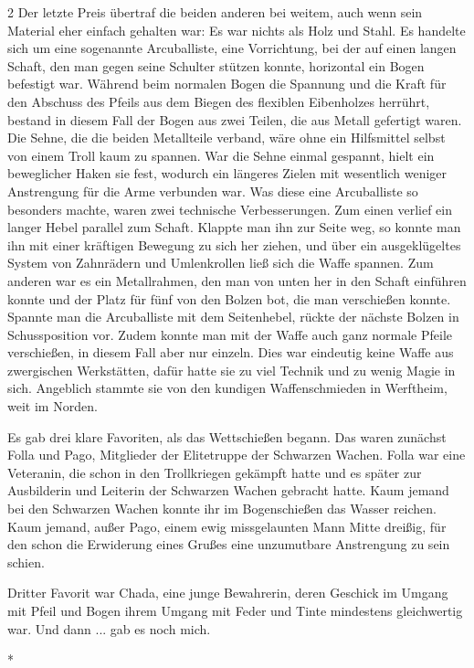 \documentclass[10pt, a4paper, oneside]{book}
\begin{document}
\begin{multicols}{2}
Der letzte Preis übertraf die beiden anderen bei weitem, auch wenn sein Material eher einfach gehalten war: Es war nichts als Holz und Stahl. Es handelte sich um eine sogenannte Arcuballiste, eine Vorrichtung, bei der auf einen langen Schaft, den man gegen seine Schulter stützen konnte, horizontal ein Bogen befestigt war. Während beim normalen Bogen die Spannung und die Kraft für den Abschuss des Pfeils aus dem Biegen des flexiblen Eibenholzes herrührt, bestand in diesem Fall der Bogen aus zwei Teilen, die aus Metall gefertigt waren. Die Sehne, die die beiden Metallteile verband, wäre ohne ein Hilfsmittel selbst von einem Troll kaum zu spannen. War die Sehne einmal gespannt, hielt ein beweglicher Haken sie fest, wodurch ein längeres Zielen mit wesentlich weniger Anstrengung für die Arme verbunden war. Was diese eine Arcuballiste so besonders machte, waren zwei technische Verbesserungen. Zum einen verlief ein langer Hebel parallel zum Schaft. Klappte man ihn zur Seite weg, so konnte man ihn mit einer kräftigen Bewegung zu sich her ziehen, und über ein ausgeklügeltes System von Zahnrädern und Umlenkrollen ließ sich die Waffe spannen. Zum anderen war es ein Metallrahmen, den man von unten her in den Schaft einführen konnte und der Platz für fünf von den Bolzen bot, die man verschießen konnte. Spannte man die Arcuballiste mit dem Seitenhebel, rückte der nächste Bolzen in Schussposition vor. Zudem konnte man mit der Waffe auch ganz normale Pfeile verschießen, in diesem Fall aber nur einzeln. Dies war eindeutig keine Waffe aus zwergischen Werkstätten, dafür hatte sie zu viel Technik und zu wenig Magie in sich. Angeblich stammte sie von den kundigen Waffenschmieden in Werftheim, weit im Norden.

Es gab drei klare Favoriten, als das Wettschießen begann. Das waren zunächst Folla und Pago, Mitglieder der Elitetruppe der Schwarzen Wachen. Folla war eine Veteranin, die schon in den Trollkriegen gekämpft hatte und es später zur Ausbilderin und Leiterin der Schwarzen Wachen gebracht hatte. Kaum jemand bei den Schwarzen Wachen konnte ihr im Bogenschießen das Wasser reichen. Kaum jemand, außer Pago, einem ewig missgelaunten Mann Mitte dreißig, für den schon die Erwiderung eines Grußes eine unzumutbare Anstrengung zu sein schien.

Dritter Favorit war Chada, eine junge Bewahrerin, deren Geschick im Umgang mit Pfeil und Bogen ihrem Umgang mit Feder und Tinte mindestens gleichwertig war. Und dann ... gab es noch mich.

\begin{center}
    *
\end{center}


\end{multicols}
\end{document}
